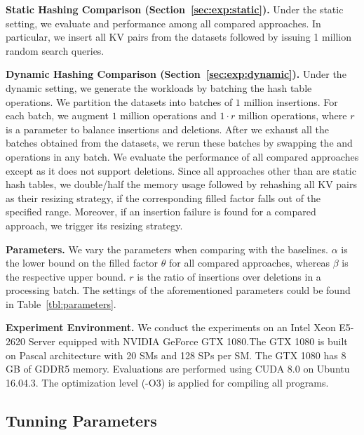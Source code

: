 \vspace{1mm}\noindent\textbf{Static Hashing Comparison (Section~\ref{sec:exp:static}).}
Under the static setting, we evaluate  and  performance among all compared approaches. 
In particular, we insert all KV pairs from the datasets followed by issuing 1 million random search queries. 

\vspace{1mm}\noindent\textbf{Dynamic Hashing Comparison (Section~\ref{sec:exp:dynamic}).}
Under the dynamic setting, we generate the workloads by batching the hash table operations. 
We partition the datasets into batches of $1$ million insertions. 
For each batch, we augment $1$ million  operations and $1 \cdot r$ million  operations,
where $r$ is a parameter to balance insertions and deletions.
After we exhaust all the batches obtained from the datasets, we rerun these batches by swapping the  and  operations in any batch. 
We evaluate the performance of all compared approaches except \cudpp as it does not support deletions. 
Since all approaches other than \voter are static hash tables, we double/half the memory usage followed by rehashing all KV pairs as their resizing strategy, if the corresponding filled factor falls out of the specified range. 
Moreover, if an insertion failure is found for a compared approach, we trigger its resizing strategy.


\vspace{1mm}\noindent\textbf{Parameters.}
We vary the parameters when comparing \voter with the baselines.
$\alpha$ is the lower bound on the filled factor $\theta$ for all compared approaches,
whereas $\beta$ is the respective upper bound.
$r$ is the ratio of insertions over deletions in a processing batch. 
The settings of the aforementioned parameters could be found in Table~\ref{tbl:parameters}.

\vspace{1mm}\noindent\textbf{Experiment Environment.}
We conduct the experiments on an Intel Xeon E5-2620 Server equipped with NVIDIA GeForce GTX 1080.The GTX 1080 is built on Pascal architecture with 20 SMs and 128 SPs per SM. The GTX 1080 has 8 GB of GDDR5 memory. Evaluations are performed using CUDA 8.0 on Ubuntu 16.04.3. The optimization level (-O3) is applied for compiling all programs.


\subsection{Tunning Parameters}

